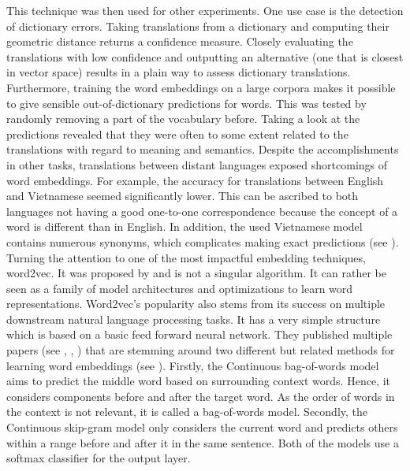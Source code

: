 \documentclass[
]{krantz}
\begin{document}
This technique was then used for other experiments. One use case is the
detection of dictionary errors. Taking translations from a dictionary
and computing their geometric distance returns a confidence measure.
Closely evaluating the translations with low confidence and outputting
an alternative (one that is closest in vector space) results in a plain
way to assess dictionary translations. Furthermore, training the word
embeddings on a large corpora makes it possible to give sensible
out-of-dictionary predictions for words. This was tested by randomly
removing a part of the vocabulary before. Taking a look at the
predictions revealed that they were often to some extent related to the
translations with regard to meaning and semantics. Despite the
accomplishments in other tasks, translations between distant languages
exposed shortcomings of word embeddings. For example, the accuracy for
translations between English and Vietnamese seemed significantly lower.
This can be ascribed to both languages not having a good one-to-one
correspondence because the concept of a word is different than in
English. In addition, the used Vietnamese model contains numerous
synonyms, which complicates making exact predictions (see
\citep{Mikolov2013a}).\\
Turning the attention to one of the most impactful embedding techniques,
word2vec. It was proposed by \citep{mikolov2013efficient} and is not a singular
algorithm. It can rather be seen as a family of model architectures and
optimizations to learn word representations. Word2vec's popularity also
stems from its success on multiple downstream natural language
processing tasks. It has a very simple structure which is based on a
basic feed forward neural network. They published multiple papers (see
\citep{mikolov2013efficient}, \citep{Mikolov2013a}, \citep{Mikolov2013b}) that are stemming
around two different but related methods for learning word embeddings
(see ). Firstly, the Continuous bag-of-words model aims to predict the
middle word based on surrounding context words. Hence, it considers
components before and after the target word. As the order of words in
the context is not relevant, it is called a bag-of-words model.
Secondly, the Continuous skip-gram model only considers the current word
and predicts others within a range before and after it in the same
sentence. Both of the models use a softmax classifier for the output
layer.
\end{document}
